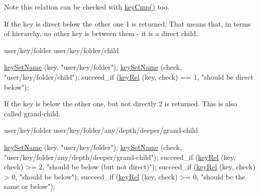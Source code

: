 \begin{DoxyNote}{Note}
this relation can be checked with \hyperlink{group__keytest_gaf6e66e12fe04d535a5d1c8218ced803e}{key\+Cmp()} too.
\end{DoxyNote}

\begin{DoxyItemize}
\item If the key is direct below the other one 1 is returned. That means that, in terms of hierarchy, no other key is between them -\/ it is a direct child. \begin{DoxyVerb}user/key/folder
user/key/folder/child
\end{DoxyVerb}

\end{DoxyItemize}


\begin{DoxyCode}
\hyperlink{group__keyname_ga7699091610e7f3f43d2949514a4b35d9}{keySetName} (key, \textcolor{stringliteral}{"user/key/folder"});
\hyperlink{group__keyname_ga7699091610e7f3f43d2949514a4b35d9}{keySetName} (check, \textcolor{stringliteral}{"user/key/folder/child"});
succeed\_if (\hyperlink{group__keytest_ga6bb0f95ac34ce9c42d61bb35a76139d0}{keyRel} (key, check) == 1, \textcolor{stringliteral}{"should be direct below"});
\end{DoxyCode}



\begin{DoxyItemize}
\item If the key is below the other one, but not directly 2 is returned. This is also called grand-\/child. \begin{DoxyVerb}user/key/folder
user/key/folder/any/depth/deeper/grand-child
\end{DoxyVerb}

\end{DoxyItemize}


\begin{DoxyCode}
\hyperlink{group__keyname_ga7699091610e7f3f43d2949514a4b35d9}{keySetName} (key, \textcolor{stringliteral}{"user/key/folder"});
\hyperlink{group__keyname_ga7699091610e7f3f43d2949514a4b35d9}{keySetName} (check, \textcolor{stringliteral}{"user/key/folder/any/depth/deeper/grand-child"});
succeed\_if (\hyperlink{group__keytest_ga6bb0f95ac34ce9c42d61bb35a76139d0}{keyRel} (key, check) >= 2, \textcolor{stringliteral}{"should be below (but not direct)"});
succeed\_if (\hyperlink{group__keytest_ga6bb0f95ac34ce9c42d61bb35a76139d0}{keyRel} (key, check) > 0, \textcolor{stringliteral}{"should be below"});
succeed\_if (\hyperlink{group__keytest_ga6bb0f95ac34ce9c42d61bb35a76139d0}{keyRel} (key, check) >= 0, \textcolor{stringliteral}{"should be the same or below"});
\end{DoxyCode}



